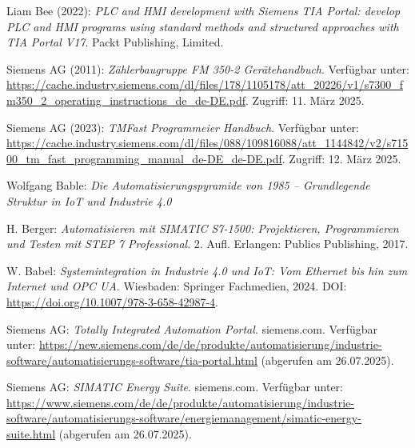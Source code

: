 \cleardoublepage
\listoffigures
{}

\cleardoublepage
\listoftables
{}


\begin{thebibliography}{}

Liam Bee (2022): \textit{PLC and HMI development with Siemens TIA Portal: develop PLC and HMI programs using standard methods and structured approaches with TIA Portal V17}. Packt Publishing, Limited.

Siemens AG (2011): \textit{Zählerbaugruppe FM 350-2 Gerätehandbuch}. Verfügbar unter: \url{https://cache.industry.siemens.com/dl/files/178/1105178/att_20226/v1/s7300_fm350_2_operating_instructions_de_de-DE.pdf}. Zugriff: 11. März 2025.

Siemens AG (2023): \textit{TMFast Programmeier Handbuch}. Verfügbar unter: \url{https://cache.industry.siemens.com/dl/files/088/109816088/att_1144842/v2/s71500_tm_fast_programming_manual_de-DE_de-DE.pdf}. Zugriff: 12. März 2025.

Wolfgang Bable: \textit{Die Automatisierungspyramide von 1985 – Grundlegende Struktur in IoT und Industrie 4.0}

H. Berger: \textit{Automatisieren mit SIMATIC S7-1500: Projektieren, Programmieren und Testen mit STEP 7 Professional}. 2. Aufl. Erlangen: Publics Publishing, 2017.

W. Babel: \textit{Systemintegration in Industrie 4.0 und IoT: Vom Ethernet bis hin zum Internet und OPC UA}. Wiesbaden: Springer Fachmedien, 2024. DOI: \url{https://doi.org/10.1007/978-3-658-42987-4}.

Siemens AG: \textit{Totally Integrated Automation Portal}. siemens.com. Verfügbar unter: \url{https://new.siemens.com/de/de/produkte/automatisierung/industrie-software/automatisierungs-software/tia-portal.html} (abgerufen am 26.07.2025).

Siemens AG: \textit{SIMATIC Energy Suite}. siemens.com. Verfügbar unter: \url{https://www.siemens.com/de/de/produkte/automatisierung/industrie-software/automatisierungs-software/energiemanagement/simatic-energy-suite.html} (abgerufen am 26.07.2025).


\end{thebibliography}
